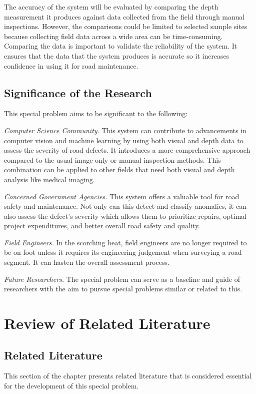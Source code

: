 \documentclass{report} %
\begin{document}
	
	The accuracy of the system will be evaluated by comparing the depth measurement it produces against data collected from the field through manual inspections. However, the comparisons could be limited to selected sample sites because collecting field data across a wide area can be time-consuming. Comparing the data is important to validate the reliability of the system. It ensures that the data that the system produces is accurate so it increases confidence in using it for road maintenance. 
	
	
	\section{Significance of the Research}
	\label{sec:significance}
	
	This special problem aims to be significant to the following:
	
	
	\textit{Computer Science Community}. This system can contribute to advancements in computer vision and machine learning by using both visual and depth data to assess the severity of road defects. It introduces a more comprehensive approach compared to the usual image-only or manual inspection methods. This combination can be applied to other fields that need both visual and depth analysis like medical imaging. 
	
	
	\textit{Concerned Government Agencies.} This system offers a valuable tool for road safety and maintenance. Not only can this detect and classify anomalies, it can also assess the defect’s severity which allows them to prioritize repairs, optimal project expenditures, and better overall road safety and quality. 
	
	
	\textit{Field Engineers.} In the scorching heat, field engineers are no longer required to be on foot unless it requires its engineering judgement when surveying a road segment. It can hasten the overall assessment process. 
	
	
	\textit{Future Researchers.} The special problem can serve as a baseline and guide of researchers with the aim to pursue special problems similar or related to this. 
	
	\chapter{Review of Related Literature}
	
	\section{Related Literature}
	This section of the chapter presents related literature that is considered essential for the development of this special problem.
	
\end{document}
